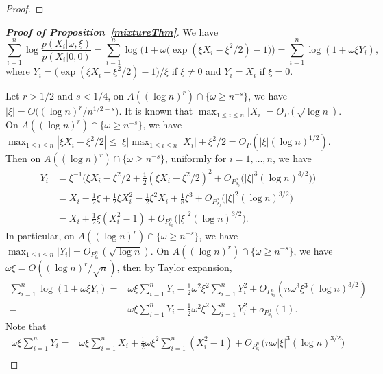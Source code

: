 \documentclass[11pt]{article}
\theoremstyle{plain}
\theoremstyle{definition}
\theoremstyle{remark}
\begin{document}
\begin{appendices}
\begin{proof}
\end{proof}


\begin{proof}[\textbf{Proof of Proposition~\ref{mixtureThm}}]
We have
\begin{equation*}
    \sum_{i=1}^n \log \frac{p(X_i|\omega,\xi)}{ p(X_i|0,0)}
    =\sum_{i=1}^n \log\Big(1+\omega \big(\exp(\xi X_i -\xi^2/2)-1\big)\Big)=\sum_{i=1}^n \log(1+\omega \xi Y_i),
\end{equation*}
where
$
Y_i=\big(\exp(\xi X_i -\xi^2/2)-1\big)/\xi
$ if $\xi \neq 0$ and $Y_i=X_i$ if $\xi =0$.

Let $r>1/2$ and $s< 1/4$, on $A((\log n)^r)\cap \{\omega\geq n^{-s}\}$,
we have $|\xi| = O\big((\log n)^{r}/n^{1/2-s}\big)$.
It is known that $\max_{1\leq i \leq n}|X_i|=O_P(\sqrt{\log n})$.
On $A((\log n)^r)\cap \{\omega\geq n^{-s}\}$, we have $\max_{1\leq i\leq n}|\xi X_i-\xi^2/2|\leq |\xi| \max_{1\leq i\leq n}|X_i|+\xi^2/2=O_P(|\xi|(\log n)^{1/2})$.
Then on $A((\log n)^r)\cap \{\omega\geq n^{-s}\}$, uniformly for $i=1,\ldots, n$, we have
\begin{align*}
Y_i&=\xi^{-1}\Big(\xi X_i-\xi^2/2 +\frac{1}{2}(\xi X_i-\xi^2/2)^2+O_{P^n_{\theta_0}} \big(|\xi|^3 (\log n)^{3/2}\big)\Big) 
    \\
    &=X_i-\frac{1}{2}\xi+\frac{1}{2} \xi X_i^2-\frac{1}{2} \xi^2 X_i +\frac{1}{8}\xi^3+O_{P^n_{\theta_0}} \big(|\xi|^2 (\log n)^{3/2}\big)
    \\
    &=X_i+\frac{1}{2} \xi (X_i^2-1) + O_{P^n_{\theta_0}} \big(|\xi|^2 (\log n)^{3/2}\big).
\end{align*}
In particular, on $A((\log n)^r)\cap \{\omega\geq n^{-s}\}$, we have $\max_{1\leq i \leq n}|Y_i|=O_{P^n_{\theta_0}}(\sqrt{\log n})$.
On $A((\log n)^r)\cap \{\omega\geq n^{-s}\}$, we have $\omega \xi =O((\log n)^r /\sqrt{n})$, then by Taylor expansion, 
\begin{align*}
    \sum_{i=1}^n \log(1+\omega \xi Y_i)
    =& \omega \xi\sum_{i=1}^n Y_i -\frac{1}{2} \omega^2 \xi^2 \sum_{i=1}^n Y_i^2+O_{P^n_{\theta_0}}(n\omega^3 \xi^3 (\log n)^{3/2})
    \\
    =& \omega \xi\sum_{i=1}^n Y_i -\frac{1}{2} \omega^2 \xi^2 \sum_{i=1}^n Y_i^2+o_{P^n_{\theta_0}}(1).
\end{align*}
Note that
\begin{align*}
    \omega \xi\sum_{i=1}^n Y_i
    =&
    \omega \xi\sum_{i=1}^n 
    X_i+\frac{1}{2} \omega \xi^2\sum_{i=1}^n (X_i^2-1) + O_{P^n_{\theta_0}} \big(n\omega |\xi|^3 (\log n)^{3/2}\big)
    \\

\end{align*}
\end{proof}
\end{appendices}
\end{document}
